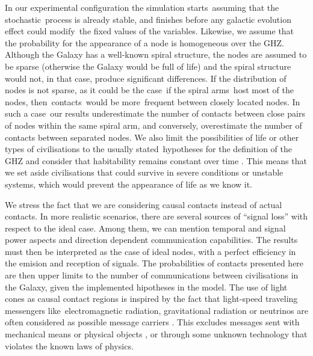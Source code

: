 \documentclass[crop]{CSLB}
\newcommand{\ceti}{node}
\newcommand{\cetis}{nodes}
\begin{document}
In our experimental configuration the simulation starts assuming that the
stochastic process is already stable, and finishes before any galactic
evolution effect could modify the fixed values of the variables.
%
Likewise, we assume that the probability for the appearance of a \ceti{} is
homogeneous over the GHZ.
%
Although the Galaxy has a well-known spiral structure, the nodes are assumed
to be sparse (otherwise the Galaxy would be full of life) and the spiral
structure would not, in that case, produce significant differences.
%
If the distribution of nodes is not sparse, as it could be the case if the
spiral arms host most of the \cetis{}, then contacts would be more frequent
between closely located nodes.
%
In such a case our results underestimate the number of contacts between
close pairs of nodes within the same spiral arm, and conversely, overestimate
the number of contacts between separated nodes.
%
We also limit the possibilities of life or other types of civilisations to the
usually stated hypotheses for the definition of the GHZ
\citep{dayal_habitability_2016, gonzalez_galactic_2001,
lineweaver_galactic_2004, gonzalez_habitable_2005, morrison_extending_2015,
haqq-misra_evolution_2019, rahvar_cosmic_2016, gobat_evolution_2016,
rahvar_cosmic_2016} and consider that habitability remains constant over time
\citep[see, however, ][]{gonzalez_habitable_2005, dayal_habitability_2016,
gobat_evolution_2016}.
%
This means that we set aside civilisations that could survive in severe
conditions or unstable systems, which would prevent the appearance of life as
we know it.  



We stress the fact that we are
considering causal contacts instead of actual contacts.
%
In more realistic scenarios, there are several sources of ``signal loss'' with
respect to the ideal case.
%
Among them, we can mention temporal and signal power aspects and direction
dependent communication capabilities.
%
The results must then be interpreted as the case of ideal nodes, with a perfect
efficiency in the emision and reception of signals.
%
The probabilities of contacts presented here are then upper limits to the
number of communications between civilisations in the Galaxy, given the
implemented hipotheses in the model.
%
The use of light cones as causal contact regions is inspired by the fact that
light-speed traveling messengers like electromagnetic radiation, gravitational
radiation or neutrinos are often considered as possible message carriers
\citep{hippke_interstellar_2017, wright_how_2018}.
%
This excludes messages sent with mechanical means or physical objects
\citep[e.g., ][]{Armstrong2013, barlow_galactic_2013}, or through some unknown
technology that violates the known laws of physics.
\end{document}
